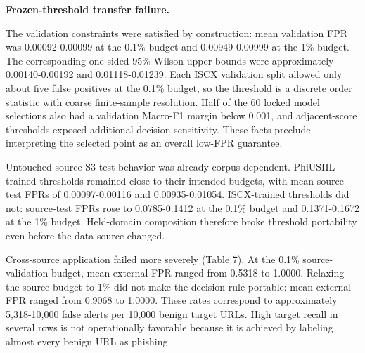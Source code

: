 \documentclass[
  10pt,
]{article}
\begin{document}
\textbf{Frozen-threshold transfer failure.}

The validation constraints were satisfied by construction: mean
validation FPR was 0.00092-0.00099 at the 0.1\% budget and
0.00949-0.00999 at the 1\% budget. The corresponding one-sided 95\%
Wilson upper bounds were approximately 0.00140-0.00192 and
0.01118-0.01239. Each ISCX validation split allowed only about five
false positives at the 0.1\% budget, so the threshold is a discrete
order statistic with coarse finite-sample resolution. Half of the 60
locked model selections also had a validation Macro-F1 margin below
0.001, and adjacent-score thresholds exposed additional decision
sensitivity. These facts preclude interpreting the selected point as an
overall low-FPR guarantee.

Untouched source S3 test behavior was already corpus dependent.
PhiUSIIL-trained thresholds remained close to their intended budgets,
with mean source-test FPRs of 0.00097-0.00116 and 0.00935-0.01054.
ISCX-trained thresholds did not: source-test FPRs rose to 0.0785-0.1412
at the 0.1\% budget and 0.1371-0.1672 at the 1\% budget. Held-domain
composition therefore broke threshold portability even before the data
source changed.

Cross-source application failed more severely (Table 7). At the 0.1\%
source-validation budget, mean external FPR ranged from 0.5318 to
1.0000. Relaxing the source budget to 1\% did not make the decision rule
portable: mean external FPR ranged from 0.9068 to 1.0000. These rates
correspond to approximately 5,318-10,000 false alerts per 10,000 benign
target URLs. High target recall in several rows is not operationally
favorable because it is achieved by labeling almost every benign URL as
phishing.
\end{document}
